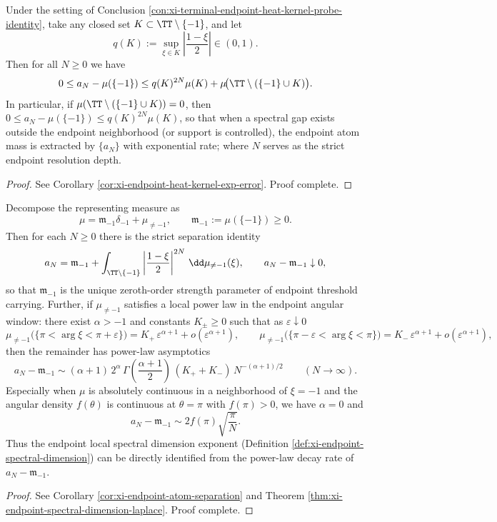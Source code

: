 \begin{conclusion}\label{con:xi-terminal-endpoint-atom-exponential-error}
Under the setting of Conclusion \ref{con:xi-terminal-endpoint-heat-kernel-probe-identity}, take any closed set \(K\subset\TT\setminus\{-1\}\), and let
\[
q(K):=\sup_{\xi\in K}\left|\frac{1-\xi}{2}\right|\in(0,1).
\]
Then for all \(N\ge 0\) we have
\[
0\le a_N-\mu(\{-1\})\le q(K)^{2N}\mu(K)+\mu\!\bigl(\TT\setminus(\{-1\}\cup K)\bigr).
\]
In particular, if \(\mu(\TT\setminus(\{-1\}\cup K))=0\), then
\(
0\le a_N-\mu(\{-1\})\le q(K)^{2N}\mu(K)
\), so that when a spectral gap exists outside the endpoint neighborhood (or support is controlled), the endpoint atom mass is extracted by \(\{a_N\}\) with exponential rate; where \(N\) serves as the strict endpoint resolution depth.
\end{conclusion}
\begin{proof}[Proof]
See Corollary \ref{cor:xi-endpoint-heat-kernel-exp-error}. Proof complete.
\end{proof}

\begin{conclusion}\label{con:xi-terminal-endpoint-threshold-spectral-dimension}
Decompose the representing measure as
\[
\mu=\mathfrak m_{-1}\delta_{-1}+\mu_{\neq -1},
\qquad
\mathfrak m_{-1}:=\mu(\{-1\})\ge 0.
\]
Then for each \(N\ge 0\) there is the strict separation identity
\[
a_N=\mathfrak m_{-1}+\int_{\TT\setminus\{-1\}}\left|\frac{1-\xi}{2}\right|^{2N}\,\dd\mu_{\neq-1}(\xi),
\qquad
a_N-\mathfrak m_{-1}\downarrow 0,
\]
so that \(\mathfrak m_{-1}\) is the unique zeroth-order strength parameter of endpoint threshold carrying. Further, if \(\mu_{\neq -1}\) satisfies a local power law in the endpoint angular window: there exist \(\alpha>-1\) and constants \(K_\pm\ge 0\) such that as \(\varepsilon\downarrow 0\)
\[
\mu_{\neq -1}\bigl(\{\pi<\arg\xi<\pi+\varepsilon\}\bigr)=K_+\,\varepsilon^{\alpha+1}+o(\varepsilon^{\alpha+1}),
\qquad
\mu_{\neq -1}\bigl(\{\pi-\varepsilon<\arg\xi<\pi\}\bigr)=K_-\,\varepsilon^{\alpha+1}+o(\varepsilon^{\alpha+1}),
\]
then the remainder has power-law asymptotics
\[
a_N-\mathfrak m_{-1}\sim (\alpha+1)\,2^{\alpha}\,
\Gamma\!\left(\frac{\alpha+1}{2}\right)\,
(K_++K_-)\,N^{-(\alpha+1)/2}\qquad (N\to\infty).
\]
Especially when \(\mu\) is absolutely continuous in a neighborhood of \(\xi=-1\) and the angular density \(f(\theta)\) is continuous at \(\theta=\pi\) with \(f(\pi)>0\), we have \(\alpha=0\) and
\[
a_N-\mathfrak m_{-1}\sim 2f(\pi)\sqrt{\frac{\pi}{N}}.
\]
Thus the endpoint local spectral dimension exponent (Definition \ref{def:xi-endpoint-spectral-dimension}) can be directly identified from the power-law decay rate of \(a_N-\mathfrak m_{-1}\).
\end{conclusion}
\begin{proof}[Proof]
See Corollary \ref{cor:xi-endpoint-atom-separation} and Theorem \ref{thm:xi-endpoint-spectral-dimension-laplace}. Proof complete.
\end{proof}

